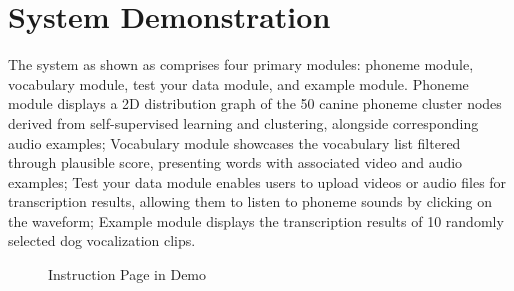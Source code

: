 \section{System Demonstration}

The system as shown as  comprises four primary modules: phoneme module, vocabulary module, test your data module, and example module.
Phoneme module displays a 2D distribution graph of the 50 canine phoneme cluster nodes derived from self-supervised learning and clustering, alongside corresponding audio examples; 
Vocabulary module showcases the vocabulary list filtered through plausible score, presenting words with associated video and audio examples; 
Test your data module enables users to upload videos or audio files for transcription results, allowing them to listen to phoneme sounds by clicking on the waveform;
Example module displays the transcription results of 10 randomly selected dog vocalization clips.
\begin{figure}[th]
    \centering
    \caption{Instruction Page in Demo}
    \label{fig:demo_ov}
\end{figure}

